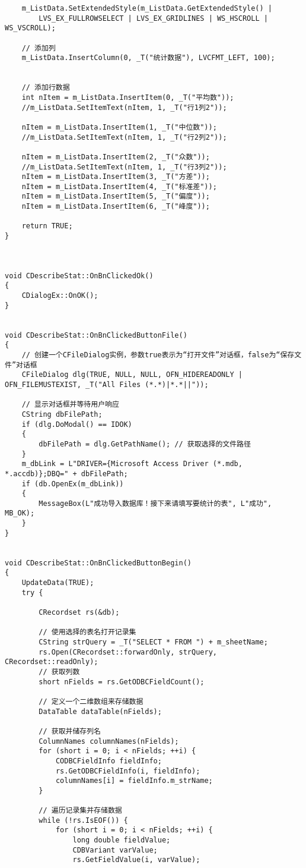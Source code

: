 \begin{lstlisting}
	m_ListData.SetExtendedStyle(m_ListData.GetExtendedStyle() | 
		LVS_EX_FULLROWSELECT | LVS_EX_GRIDLINES | WS_HSCROLL | WS_VSCROLL);

	// 添加列
	m_ListData.InsertColumn(0, _T("统计数据"), LVCFMT_LEFT, 100);
	

	// 添加行数据
	int nItem = m_ListData.InsertItem(0, _T("平均数"));
	//m_ListData.SetItemText(nItem, 1, _T("行1列2"));

	nItem = m_ListData.InsertItem(1, _T("中位数"));
	//m_ListData.SetItemText(nItem, 1, _T("行2列2"));

	nItem = m_ListData.InsertItem(2, _T("众数"));
	//m_ListData.SetItemText(nItem, 1, _T("行3列2"));
	nItem = m_ListData.InsertItem(3, _T("方差"));
	nItem = m_ListData.InsertItem(4, _T("标准差"));
	nItem = m_ListData.InsertItem(5, _T("偏度"));
	nItem = m_ListData.InsertItem(6, _T("峰度"));
	
	return TRUE;  
}



void CDescribeStat::OnBnClickedOk()
{
	CDialogEx::OnOK();
}


void CDescribeStat::OnBnClickedButtonFile()
{
	// 创建一个CFileDialog实例，参数true表示为“打开文件”对话框，false为“保存文件”对话框
	CFileDialog dlg(TRUE, NULL, NULL, OFN_HIDEREADONLY | OFN_FILEMUSTEXIST, _T("All Files (*.*)|*.*||"));

	// 显示对话框并等待用户响应
	CString dbFilePath;
	if (dlg.DoModal() == IDOK)
	{
		dbFilePath = dlg.GetPathName(); // 获取选择的文件路径
	}
	m_dbLink = L"DRIVER={Microsoft Access Driver (*.mdb, *.accdb)};DBQ=" + dbFilePath;
	if (db.OpenEx(m_dbLink))
	{
		MessageBox(L"成功导入数据库！接下来请填写要统计的表", L"成功", MB_OK);
	}
}


void CDescribeStat::OnBnClickedButtonBegin()
{
	UpdateData(TRUE);
	try {
		
		CRecordset rs(&db);

		// 使用选择的表名打开记录集
		CString strQuery = _T("SELECT * FROM ") + m_sheetName;
		rs.Open(CRecordset::forwardOnly, strQuery, CRecordset::readOnly);
		// 获取列数
		short nFields = rs.GetODBCFieldCount();

		// 定义一个二维数组来存储数据
		DataTable dataTable(nFields);

		// 获取并储存列名
		ColumnNames columnNames(nFields);
		for (short i = 0; i < nFields; ++i) {
			CODBCFieldInfo fieldInfo;
			rs.GetODBCFieldInfo(i, fieldInfo);
			columnNames[i] = fieldInfo.m_strName;
		}

		// 遍历记录集并存储数据
		while (!rs.IsEOF()) {
			for (short i = 0; i < nFields; ++i) {
				long double fieldValue;
				CDBVariant varValue;
				rs.GetFieldValue(i, varValue);


\end{lstlisting}
